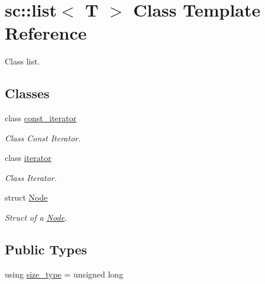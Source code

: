 \hypertarget{classsc_1_1list}{}\section{sc\+:\+:list$<$ T $>$ Class Template Reference}
\label{classsc_1_1list}


Class list.  


\subsection*{Classes}
\begin{DoxyCompactItemize}
\item 
class \hyperlink{classsc_1_1list_1_1const__iterator}{const\+\_\+iterator}
\begin{DoxyCompactList}\small\item\em Class Const Iterator. \end{DoxyCompactList}\item 
class \hyperlink{classsc_1_1list_1_1iterator}{iterator}
\begin{DoxyCompactList}\small\item\em Class Iterator. \end{DoxyCompactList}\item 
struct \hyperlink{structsc_1_1list_1_1_node}{Node}
\begin{DoxyCompactList}\small\item\em Struct of a \hyperlink{structsc_1_1list_1_1_node}{Node}. \end{DoxyCompactList}\end{DoxyCompactItemize}
\subsection*{Public Types}
\begin{DoxyCompactItemize}
\item 
using \hyperlink{classsc_1_1list_acbac64cff34d45bb9c61771493db48ec}{size\+\_\+type} = unsigned long
\end{DoxyCompactItemize}
